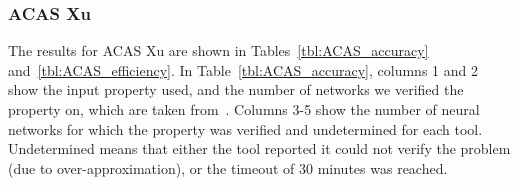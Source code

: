 \begin{table}
%
%
\centering
\caption{Efficiency of \diffNN{} vs. \ReluVal{} on ACAS Xu. }
\label{tbl:ACAS_efficiency}
\end{table}



\subsubsection{ACAS Xu}
The results for ACAS Xu are shown in Tables~\ref{tbl:ACAS_accuracy} and~\ref{tbl:ACAS_efficiency}.
%
In Table~\ref{tbl:ACAS_accuracy}, columns 1 and 2 show the input property
used, and the number of networks we verified the property on, which are taken from~\cite{KatzBDJK17, WangPWYJ18}.
%
Columns 3-5 show the number of neural networks for which the
property was verified and undetermined for each tool.
%
Undetermined means that either the tool reported it could not verify the problem (due to over-approximation),
or the timeout of 30 minutes was reached.

